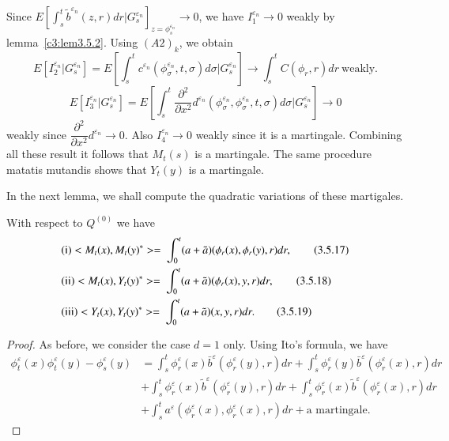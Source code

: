 Since $E \left[\int^t_s \tilde{b}^{\varepsilon_n}(z,r) dr |
  {G}^{\varepsilon_n}_s\right]_{z = \phi^{\varepsilon_n}_s} \rightarrow 0$,
we have $I^{\varepsilon_n}_1 \rightarrow 0$ weakly by 
lemma~\ref{c3:lem3.5.2}. Using $(A2)_k$, we obtain 
$$
E \left[I^{\varepsilon_n}_2 | G^{\varepsilon_n}_s\right] = E \left[ \int^t_s
  c^{\varepsilon_n} (\phi^{\varepsilon_n}_\sigma,  t, \sigma) d\sigma
  | G^{\varepsilon_n}_s\right] \rightarrow \int^t_s C(\phi_r,  r)dr
~\text{weakly}.  
$$\pageoriginale
$$E\left[ I^{\varepsilon_n}_3 | G^{\varepsilon_n}_s\right] = E \left[
  \int^t_s \dfrac{\partial^2}{\partial x^2} d^{\varepsilon_n}
  (\phi^{\varepsilon_n}_\sigma,  \phi^{\varepsilon_n}_\sigma,  t, \sigma)
 d \sigma | G^{\varepsilon_n}_s\right] \rightarrow 0$$ 
weakly since
$\dfrac{\partial^2}{\partial x^2} d^{\varepsilon_n} \rightarrow 0
$. Also $I^{\varepsilon_n}_4 \rightarrow 0$ weakly since it is a
martingale. Combining all these result it follows that $M_t(s)$ is a
martingale. The same procedure matatis mutandis shows that $Y_t(y)$ is
a martingale. 

In the next lemma, we shall compute the quadratic variations of these
martigales. 

\setcounter{Lemma}{4}
\begin{Lemma}\label{c3:lem3.5.5} %
  With respect to $Q^{(0)}$ we have
\begin{align*}
&{\rm (i) }  
    <M_t(x),  M_t(y)^*>  =~ \int^t_0 (a + \tilde{a})
    (\phi_r(x), \phi_r (y), r)dr,  \tag{3.5.17}\label{c3:eq3.5.17}\\
&{\rm (ii) }< M_t(x),  Y_t(y)^*>  =~ \int^t_0 (a + \tilde{a})
 (\phi_r(x),y,r) dr, \tag{3.5.18}\label{c3:eq3.5.18}\\ 
&{\rm (iii) } <Y_t(x),  Y_t(y)^*>  =~ \int^t_0 (a + \tilde{a})
    (x,y,r)dr. \tag{3.5.19}\label{c3:eq3.5.19} 
\end{align*}
\end{Lemma}


\begin{proof}
  As before, we consider the case $d = 1$ only. Using Ito's formula, we have 
  \begin{align*}
    \phi^\varepsilon_t (x)\phi^\varepsilon_t(y) -
    \phi^\varepsilon_s(y) & = \int^t_s \phi^\varepsilon_r (x)
    \bar{b}^{\varepsilon}(\phi^\varepsilon_r(y),r)dr + \int^t_s
    \phi^\varepsilon_r(y) \bar{b}^{\varepsilon}(\phi^\varepsilon_r(x),r)dr \\ 
    & + \int^t_s \phi^{\varepsilon}_r(x)
    \tilde{b}^{\varepsilon}(\phi^\varepsilon_r(y),r)dr + \int^t_s
    \phi^\varepsilon_r (x)
    \tilde{b}^{\varepsilon}(\phi^\varepsilon_r(x),r)dr \\ 
    & +\int^t_s a^{\varepsilon}
    (\phi^{\varepsilon}_r(x),\phi^\varepsilon_r(x),r)dr +
    \text{a martingale}. \tag{3.5.20}\label{c3:eq3.5.20} 
\end{align*}
\end{proof}

